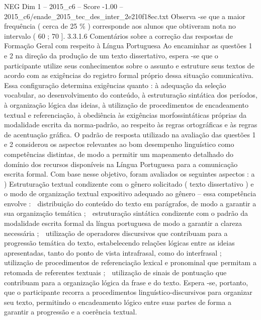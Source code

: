 \begin{textsample}{NEG Dim 1 – 2015\_c6 – Score -1.00 – 2015\_c6/enade\_2015\_tec\_des\_inter\_2e210f18ec.txt}
Observa -se que a maior frequência ( cerca de 25 \% ) corresponde aos alunos que obtiveram nota no intervalo ( 60 ; 70 ]. 3.3.1.6 Comentários sobre a correção das respostas de Formação Geral com respeito à Língua Portuguesa Ao encaminhar as questões 1 e 2 na direção da produção de um texto dissertativo, espera -se que o participante utilize seus conhecimentos sobre o assunto e estruture seus textos de acordo com as exigências do registro formal próprio dessa situação comunicativa.
Essa configuração determina exigências quanto : à adequação da seleção vocabular, ao desenvolvimento do conteúdo, à estruturação sintática dos períodos, à organização lógica das ideias, à utilização de procedimentos de encadeamento textual e referenciação, à obediência às exigências morfossintáticas próprias da modalidade escrita da norma-padrão, ao respeito às regras ortográficas e às regras de acentuação gráfica.
O padrão de resposta utilizado na avaliação das questões 1 e 2 considerou os aspectos relevantes ao bom desempenho linguístico como competências distintas, de modo a permitir um mapeamento detalhado do domínio dos recursos disponíveis na Língua Portuguesa para a comunicação escrita formal.
Com base nesse objetivo, foram avaliados os seguintes aspectos : a ) Estruturação textual condizente com o gênero solicitado ( texto dissertativo ) e o modo de organização textual expositivo adequado ao gênero – essa competência envolve :  distribuição do conteúdo do texto em parágrafos, de modo a garantir a sua organização temática ;  estruturação sintática condizente com o padrão da modalidade escrita formal da língua portuguesa de modo a garantir a clareza necessária ;  utilização de operadores discursivos que contribuam para a progressão temática do texto, estabelecendo relações lógicas entre as ideias apresentadas, tanto do ponto de vista intrafrasal, como do interfrasal ;  utilização de procedimentos de referenciação lexical e pronominal que permitam a retomada de referentes textuais ;  utilização de sinais de pontuação que contribuam para a organização lógica da frase e do texto.
Espera -se, portanto, que o participante recorra a procedimentos linguístico-discursivos para organizar seu texto, permitindo o encadeamento lógico entre suas partes de forma a garantir a progressão e a coerência textual.

\end{textsample}

